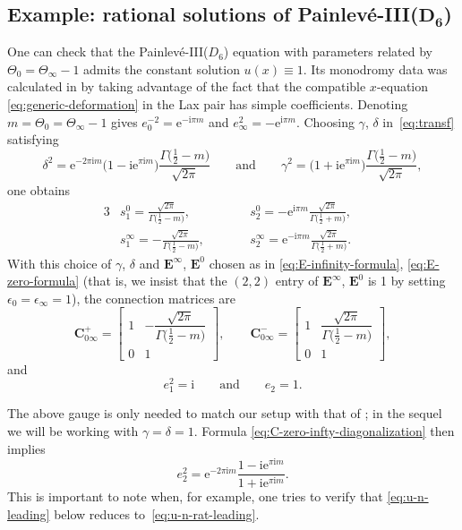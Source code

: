 \documentclass[pdftex]{sigma}
\numberwithin{equation}{section}
\newcommand{\ee}{\mathrm{e}}
\newcommand{\ii}{\mathrm{i}}
\begin{document}
\subsection[Example: rational solutions of Painlev\'e-III(D\_6)]{Example: rational solutions of Painlev\'e-III($\boldsymbol{D_6}$)}\label{sec:rational-solutions-parameters}
One can check that the Painlev\'e-III($D_6$) equation with parameters related by $\Theta_0=\Theta_\infty-1$ admits the constant solution $u(x)\equiv 1$. Its monodromy data was calculated in \cite[Section 4]{BMS18} by taking advantage of the fact that the compatible $x$-equation \eqref{eq:generic-deformation} in the Lax pair has simple coefficients. Denoting $m=\Theta_0=\Theta_\infty-1$ gives $e_0^{-2}=\ee^{-\ii\pi m}$ and $e_\infty^2=-\ee^{\ii\pi m}$. Choosing $\gamma$, $\delta$ in~\eqref{eq:transf} satisfying
\[ %
\delta^2 = \ee^{-2\pi \ii m} \big(1 - \ii \ee^{\pi \ii m}\big)\dfrac{\Gamma\big(\frac{1}{2} - m\big)}{\sqrt{2\pi}} \qquad \text{and} \qquad \gamma^2 = \big(1 + \ii \ee^{\pi \ii m}\big)\dfrac{\Gamma\big(\frac{1}{2} - m\big)}{\sqrt{2\pi}},
\]
one obtains
 \begin{alignat*}{3}
& s^0_1=\frac{\sqrt{2\pi}}{\Gamma\big(\tfrac{1}{2}-m\big)},\qquad&&
 s^0_2=-\ee^{\ii\pi m}\frac{\sqrt{2\pi}}{\Gamma\big(\tfrac{1}{2}+m\big)},&\\
& s^\infty_1=-\frac{\sqrt{2\pi}}{\Gamma\big(\tfrac{1}{2}-m\big)},\qquad&&
 s^\infty_2=\ee^{-\ii\pi m}\frac{\sqrt{2\pi}}{\Gamma\big(\tfrac{1}{2}+m\big)}.&
 \end{alignat*}
 With this choice of $\gamma$, $\delta$ and $\mathbf{E}^\infty$, $\mathbf{E}^0$ chosen as in \eqref{eq:E-infinity-formula}, \eqref{eq:E-zero-formula} (that is, we insist that the $(2,2)$ entry of $\mathbf{E}^\infty$, $\mathbf{E}^0$ is 1 by setting $\epsilon_0 = \epsilon_\infty = 1$), the connection matrices are
 \begin{equation*}
 \mathbf{C}_{0\infty}^+=\begin{bmatrix}1&-\dfrac{\sqrt{2\pi}}{\Gamma\big(\tfrac{1}{2}-m\big)} \\0&1\end{bmatrix},\qquad\mathbf{C}_{0\infty}^-=\begin{bmatrix}1&\dfrac{\sqrt{2\pi}}{\Gamma\big(\tfrac{1}{2}-m\big)} \\0&1\end{bmatrix},
 \end{equation*}
 and
 \begin{equation*}
 e_1^2=\ii \qquad \text{and} \qquad e_2 = 1.
 \end{equation*}
\begin{Remark}
 The above gauge is only needed to match our setup with that of \cite{BMS18}; in the sequel we will be working with $\gamma = \delta = 1$. Formula \eqref{eq:C-zero-infty-diagonalization} then implies
 \[
 e_2^2 = \ee^{-2\pi \ii m}\dfrac{1 - \ii \ee^{\pi \ii m}}{1 + \ii \ee^{\pi \ii m}}.
 \]
 This is important to note when, for example, one tries to verify that \eqref{eq:u-n-leading} below reduces to~\eqref{eq:u-n-rat-leading}.
\end{Remark}
\end{document}
